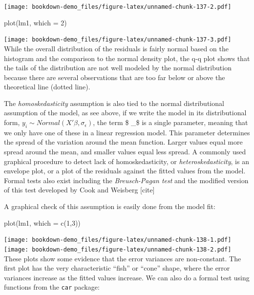 \documentclass[
]{article}
\newenvironment{Shaded}{\begin{snugshade}}{\end{snugshade}}
\newcommand{\AttributeTok}[1]{\textcolor[rgb]{0.77,0.63,0.00}{#1}}
\newcommand{\DecValTok}[1]{\textcolor[rgb]{0.00,0.00,0.81}{#1}}
\newcommand{\FunctionTok}[1]{\textcolor[rgb]{0.00,0.00,0.00}{#1}}
\newcommand{\NormalTok}[1]{#1}
\begin{document}
\texttt{[image: bookdown-demo\_files/figure-latex/unnamed-chunk-137-2.pdf]}

\begin{Shaded}
\begin{Highlighting}[]
\FunctionTok{plot}\NormalTok{(lm1, }\AttributeTok{which =} \DecValTok{2}\NormalTok{)}
\end{Highlighting}
\end{Shaded}

\texttt{[image: bookdown-demo\_files/figure-latex/unnamed-chunk-137-3.pdf]}
While the overall distribution of the residuals is fairly normal based on the histogram and the comparison to the normal density plot, the q-q plot shows that the tails of the distribution are not well modeled by the normal distribution because there are several observations that are too far below or above the theoretical line (dotted line).

The \emph{homoskedasticity} assumption is also tied to the normal distributional assumption of the model, as see above, if we write the model in its distributional form, \(y_i \sim Normal(X' \beta, \sigma_\epsilon)\), the term \$ \sigma\_\epsilon\$ is a single parameter, meaning that we only have one of these in a linear regression model. This parameter determines the spread of the variation around the mean function. Larger values equal more spread around the mean, and smaller values equal less spread. A commonly used graphical procedure to detect lack of homoskedasticity, or \emph{heteroskedasticity}, is an envelope plot, or a plot of the residuals against the fitted values from the model. Formal tests also exist including the \emph{Breusch-Pagan test} and the modified version of this test developed by Cook and Weisberg {[}cite{]}

A graphical check of this assumption is easily done from the model fit:

\begin{Shaded}
\begin{Highlighting}[]
\FunctionTok{plot}\NormalTok{(lm1, }\AttributeTok{which =} \FunctionTok{c}\NormalTok{(}\DecValTok{1}\NormalTok{,}\DecValTok{3}\NormalTok{))}
\end{Highlighting}
\end{Shaded}

\texttt{[image: bookdown-demo\_files/figure-latex/unnamed-chunk-138-1.pdf]} \texttt{[image: bookdown-demo\_files/figure-latex/unnamed-chunk-138-2.pdf]}
These plots show some evidence that the error variances are non-constant. The first plot has the very characteristic ``fish'' or ``cone'' shape, where the error variances increase as the fitted values increase. We can also do a formal test using functions from the \texttt{car} package:
\end{document}
